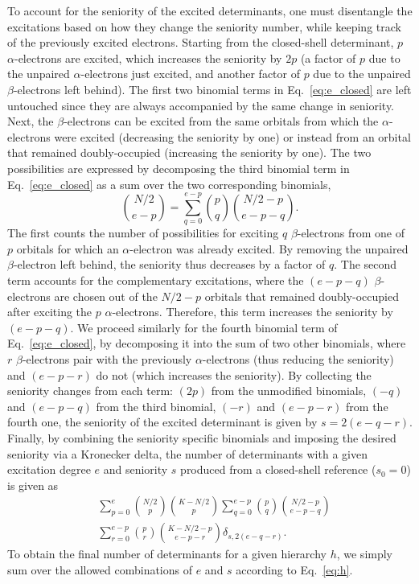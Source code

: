 \documentclass[aip,jcp,reprint,noshowkeys,superscriptaddress]{revtex4-1}
\begin{document}
To account for the seniority of the excited determinants, one must disentangle the excitations based on how they change the seniority number,
while keeping track of the previously excited electrons.
Starting from the closed-shell determinant, $p$ $\alpha$-electrons are excited, which increases the seniority by $2p$
(a factor of $p$ due to the unpaired $\alpha$-electrons just excited,
and another factor of $p$ due to the unpaired $\beta$-electrons left behind).
The first two binomial terms in Eq.~\ref{eq:e_closed} are left untouched since they are always accompanied by the same change in seniority.
Next, the $\beta$-electrons can be excited from the same orbitals from which the $\alpha$-electrons were excited (decreasing the seniority by one)
or instead from an orbital that remained doubly-occupied (increasing the seniority by one).
The two possibilities are expressed by decomposing the third binomial term in Eq.~\ref{eq:e_closed} as a sum over the two corresponding binomials,
\begin{equation}
\binom{N/2}{e-p} = \sum_{q=0}^{e-p} \binom{p}{q} \binom{N/2-p}{e-p-q}.
\end{equation}
The first counts the number of possibilities for exciting $q$ $\beta$-electrons from one of $p$ orbitals for which an $\alpha$-electron was already excited.
By removing the unpaired $\beta$-electron left behind, the seniority thus decreases by a factor of $q$.
The second term accounts for the complementary excitations, where the $(e-p-q)$ $\beta$-electrons are chosen out of the $N/2-p$ orbitals that 
remained doubly-occupied after exciting the $p$ $\alpha$-electrons.
Therefore, this term increases the seniority by $(e-p-q)$.
We proceed similarly for the fourth binomial term of Eq.~\ref{eq:e_closed}, by decomposing it into the sum of two other binomials,
where $r$ $\beta$-electrons pair with the previously $\alpha$-electrons (thus reducing the seniority) and $(e-p-r)$ do not (which increases the seniority).
By collecting the seniority changes from each term: $(2p)$ from the unmodified binomials, $(-q)$ and $(e-p-q)$ from the third binomial, $(-r)$ and $(e-p-r)$ from the fourth one,
the seniority of the excited determinant is given by $s = 2 (e-q-r)$.
Finally, by combining the seniority specific binomials and imposing the desired seniority via a Kronecker delta,
the number of determinants with a given excitation degree $e$ and seniority $s$ produced from a closed-shell reference ($s_0=0$) is given as
\begin{equation}
\begin{split}
	&\sum_{p=0}^{e} \binom{N/2}{p} \binom{K-N/2}{p}
	\sum_{q=0}^{e-p} \binom{p}{q} \binom{N/2-p}{e-p-q}  \\
	&\sum_{r=0}^{e-p} \binom{p}{r} \binom{K-N/2-p}{e-p-r}
 	\delta_{s,2(e-q-r)}.
\label{eq:det_1}
\end{split}
\end{equation}
To obtain the final number of determinants for a given hierarchy $h$, we simply sum over the allowed combinations of $e$ and $s$ according to Eq.~\eqref{eq:h}.
\end{document}
